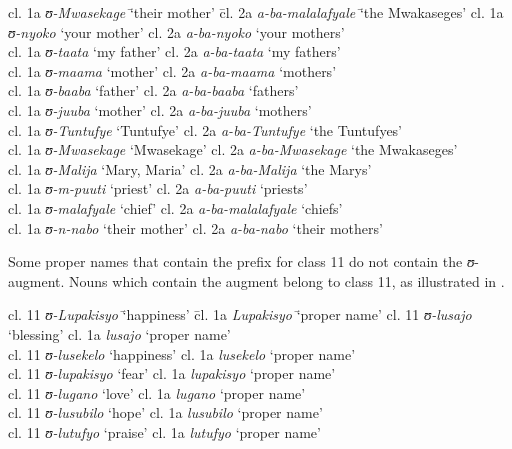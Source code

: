 \documentclass[output=paper]{langscibook}
\begin{document}
\ea%
    \label{ex:lusekelo:6}
    \small
    \begin{tabbing}
    cl. 1a \= \textit{ʊ{}-Mwasekage} \= ‘their mother’  \= cl. 2a \= \textit{a-ba-malalafyale} \= ‘the Mwakaseges’\kill
    cl. 1a  \> \textit{ʊ{}-nyoko} \> ‘your mother’ \>  cl. 2a  \> \textit{a-ba-nyoko} \> ‘your mothers’ \\
  cl. 1a \> \textit{ʊ{}-taata} \> ‘my father’ \>  cl. 2a \> \textit{a-ba-taata} \> ‘my fathers’ \\
  cl. 1a \> \textit{ʊ{}-maama} \> ‘mother’ \>  cl. 2a \> \textit{a-ba-maama} \> ‘mothers’ \\
  cl. 1a \> \textit{ʊ{}-baaba} \> ‘father’  \> cl. 2a \> \textit{a-ba-baaba} \> ‘fathers’ \\
  cl. 1a \> \textit{ʊ{}-juuba} \> ‘mother’  \> cl. 2a \> \textit{a-ba-juuba} \> ‘mothers’ \\
  cl. 1a \> \textit{ʊ{}-Tuntufye} \> `Tuntufye' \>  cl. 2a \> \textit{a-ba-Tuntufye} \> ‘the Tuntufyes’ \\
  cl. 1a \> \textit{ʊ{}-Mwasekage} \> `Mwasekage' \>  cl. 2a \> \textit{a-ba-Mwasekage} \> ‘the Mwakaseges’\\
  cl. 1a \> \textit{ʊ{}-Malija} \> ‘Mary, Maria’ \>  cl. 2a \> \textit{a-ba-Malija} \> ‘the Marys’ \\
  cl. 1a \> \textit{ʊ{}-m-puuti} \> ‘priest’  \> cl. 2a \> \textit{a-ba-puuti}  \> ‘priests’ \\
  cl. 1a \> \textit{ʊ{}-malafyale} \> ‘chief’  \>   cl. 2a \> \textit{a-ba-malalafyale} \> ‘chiefs’ \\
  cl. 1a \> \textit{ʊ{}-n-nabo} \> ‘their mother’  \> cl. 2a \> \textit{a-ba-nabo} \> ‘their mothers’
\end{tabbing}
\z

Some proper names that contain the prefix for class 11 do not contain the \textit{ʊ}{}-augment. Nouns which contain the augment belong to class 11, as illustrated in .   

\ea%
    \label{ex:lusekelo:7}
    \begin{tabbing}
    cl. 11 \= \textit{ʊ{}-Lupakisyo} \= ‘happiness’   \=  cl. 1a \= \textit{Lupakisyo} \= ‘proper name’\kill
   cl. 11 \> \textit{ʊ{}-lusajo} \> ‘blessing’ \>  cl. 1a \> \textit{lusajo} \> ‘proper name’\\
  cl. 11 \> \textit{ʊ{}-lusekelo} \> ‘happiness’ \>  cl. 1a \> \textit{lusekelo} \> ‘proper name’ \\
  cl. 11 \> \textit{ʊ{}-lupakisyo} \> ‘fear’  \>   cl. 1a \> \textit{lupakisyo} \> ‘proper name’ \\
  cl. 11 \> \textit{ʊ{}-lu}{\textit{g}}\textit{ano} \> ‘love’  \>   cl. 1a  \> \textit{lu}{\textit{g}}\textit{ano} \> ‘proper name’ \\
  cl. 11 \> \textit{ʊ{}-lusubilo} \> ‘hope’   \>  cl. 1a \> \textit{lusubilo} \> ‘proper name’\\
  cl. 11 \> \textit{ʊ{}-lutufyo} \> ‘praise’  \> cl. 1a \> \textit{lutufyo} \> ‘proper name’
  \end{tabbing}
\z
\end{document}
